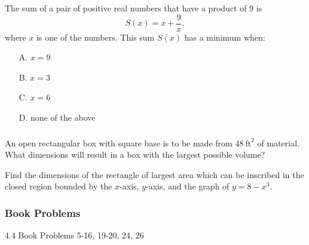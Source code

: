 \documentclass[cal1spr16Lectures.tex]{subfiles}
\begin{document}
\begin{frame}
\begin{que}
The sum of a pair of positive real numbers that have a product of 9 is 
\[S(x) = x + \frac{9}{x},\]
where $x$ is one of the numbers.  This sum $S(x)$ has a minimum when:
\begin{itemize}
\item[A. ] $x=9$
\item[B. ] $x=3$
\item[C. ] $x=6$
\item[D. ] none of the above
\end{itemize}
\end{que}
\end{frame}

\begin{frame}%
\frametitle{}
\small
\begin{exe} An open rectangular box with square base is to be made from $48\ \text{ft}^2$ of material.  What dimensions will result in a box with the largest possible volume? \end{exe}

\vspace{1pc}
\begin{exe} Find the dimensions of the rectangle of largest area which can be inscribed in the closed region bounded by the $x$-axis, $y$-axis, and the graph of $y=8-x^3$. \end{exe}
\end{frame}

\subsubsection{Book Problems}

\begin{frame}
\begin{block}{4.4 Book Problems}
5-16, 19-20, 24, 26 
\end{block}
\end{frame}
\end{document}
